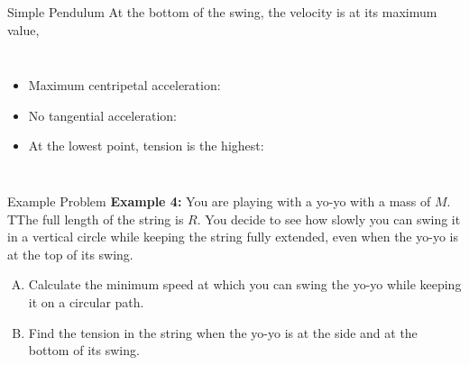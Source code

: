 \documentclass[12pt,compress,aspectratio=169]{beamer}
\begin{document}
\begin{frame}{Simple Pendulum}
  At the bottom of the swing, the velocity is at its maximum value,
  
  \vspace{.1in}\begin{columns}

    \begin{itemize}
    \item Maximum centripetal acceleration:

    \item No tangential acceleration:

    \item At the lowest point, tension is the highest:

    \end{itemize}
  \end{columns}
\end{frame}



\begin{frame}{Example Problem}
  \textbf{Example 4:} You are playing with a yo-yo with a mass of $M$. TThe
  full length of the string is $R$. You decide to see how slowly you can swing
  it in a vertical circle while keeping the string fully extended, even when
  the yo-yo is at the top of its swing.
  \begin{enumerate}[A.]
  \item Calculate the minimum speed at which you can swing the yo-yo while
    keeping it on a circular path.
  \item Find the tension in the string when the yo-yo is at the side and at the
    bottom of its swing. 
  \end{enumerate}
\end{frame}
\end{document}
